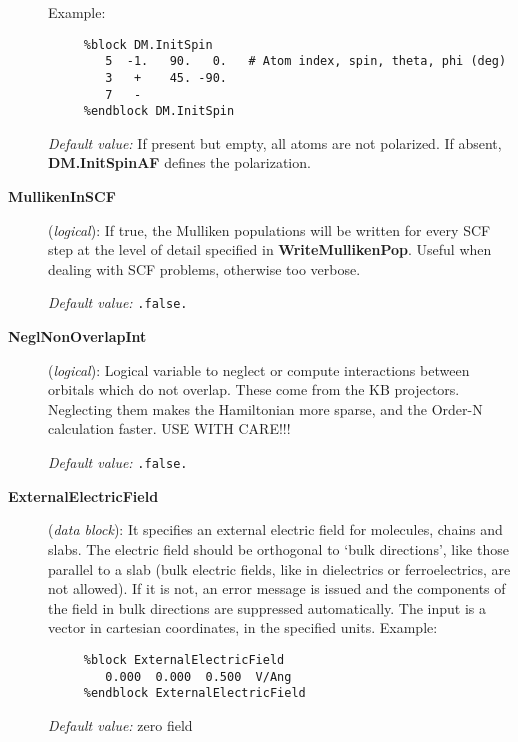 \documentclass[11pt]{article}
\begin{document}
\begin{description}
Example:

\begin{verbatim}
     %block DM.InitSpin
        5  -1.   90.   0.   # Atom index, spin, theta, phi (deg)
        3   +    45. -90.
        7   -
     %endblock DM.InitSpin
\end{verbatim}

{\it Default value:} If present but empty, all atoms are not polarized. 
If absent, {\bf DM.InitSpinAF} defines the polarization.

\item[{\bf MullikenInSCF}] ({\it logical}):
If true, the Mulliken populations will be written for every SCF step
at the level of detail specified in {\bf WriteMullikenPop}. Useful
when dealing with SCF problems, otherwise too verbose.

{\it Default value:} {\tt .false.}


\item[{\bf NeglNonOverlapInt}] ({\it logical}): 
Logical variable to neglect or compute interactions between orbitals
which do not overlap. These come from the KB projectors.
Neglecting them makes the Hamiltonian more sparse, and
the Order-N calculation faster.  USE WITH CARE!!!

{\it Default value:} {\tt .false.}
        
\item[{\bf ExternalElectricField}] ({\it data block}): 
It specifies an external electric field for molecules, chains and slabs.
The electric field should be orthogonal to `bulk directions', like
those parallel to a slab (bulk electric fields, like in
dielectrics or ferroelectrics, are not allowed). If it is not, an
error message is issued and the components of the field in bulk
directions are suppressed automatically. The input is a
vector in cartesian coordinates, in the specified units. Example:

\begin{verbatim}
     %block ExternalElectricField
        0.000  0.000  0.500  V/Ang
     %endblock ExternalElectricField
\end{verbatim}

{\it Default value:} zero field


\end{description}
\end{document}
